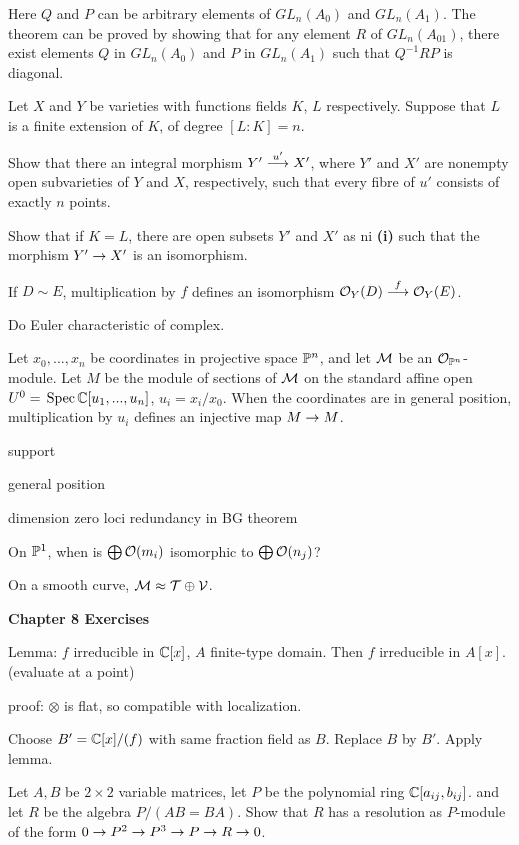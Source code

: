 \documentclass[leqno]{book}
\theoremstyle{definition}%
\numberwithin{equation}{section}
\theoremstyle{theorem} %
\begin{document}
\no Here $Q$ and $P$ can be arbitrary elements of $GL_n(A_0)$ and
$GL_n(A_1)$.  The theorem can be proved by showing that for any element
$R$ of $GL_n(A_{01})$, there exist elements $Q$ in $GL_n(A_0)$ and $P$
in $GL_n(A_1)$ such that $Q^{-1}RP$ is diagonal. 


\msno 
Let $X$ and $Y$ be varieties with functions fields $K$, $L$
respectively.  Suppose that $L$ is a finite extension of $K$, of
degree $[L:K] = n$.

 Show that there an integral morphism
$Y'\stackrel{u'}{\longrightarrow} X'$, where $Y'$ and $X'$ are nonempty open
subvarieties of $Y$ and $X$, respectively, such that every fibre of
$u'$ consists of exactly $n$ points.

 Show that if $K = L$, there are open subsets $Y'$ and $X'$ as ni
    {\bf (i)} such that the morphism $Y' \rightarrow X'$ is an isomorphism.

\msno
  If $D \sim E$, multiplication by $f$ defines
 an isomorphism 
$ {\co}_Y(D) \stackrel{f}{\longrightarrow} {\co}_Y(E)$.

\msno
  Do Euler characteristic of complex.

\msno
 Let $x_0,...,x_n$ be coordinates in projective space $\mathbb{P}^n$, and
 let ${\cm}$ be an ${\co}_{\bbp^n}$-module.  Let $M$ be the module of
 sections of ${\cm}$ on the standard affine open $U^0 = \,\operatorname{Spec}
 \mathbb{C}[u_1,...,u_n]$, $u_i = x_i/x_0$.  When the coordinates are in
 general position, multiplication by $u_i$ defines an injective map $M
 \rightarrow M$. 

\ms

support

\ms
general position

\ms
dimension zero loci
redundancy in BG theorem

\ms On $\mathbb{P}^1$, when is $\bigoplus \co(m_i)$ isomorphic to 
$\bigoplus \co(n_j)$?

\ms
On a smooth curve, $\cm \approx \ct \oplus \cv$.

\newpage


\centerline{\bf Chapter 8 Exercises}


\ms
Lemma:  $f$ irreducible in $\mathbb{C}[x]$, $A$ finite-type domain.
Then $f$ irreducible in $A[x]$.  (evaluate at a point)

\ms
proof: $\otimes$ is flat, so compatible with localization.

\ms
Choose $B' = \mathbb{C}[x]/(f)$ with same fraction field as $B$.
Replace $B$ by $B'$.  Apply lemma.

\bs Let $A,B$ be $2\times 2$ variable matrices, let $P$ be the
polynomial ring $\mathbb{C}[a_{ij},b_{ij}]$. and let $R$ be the algebra
  $P/(AB=BA)$.  Show that $R$ has a resolution as $P$-module of the
  form $0 \rightarrow P^2 \rightarrow P^3\rightarrow P \rightarrow R \rightarrow 0$.
\end{document}
